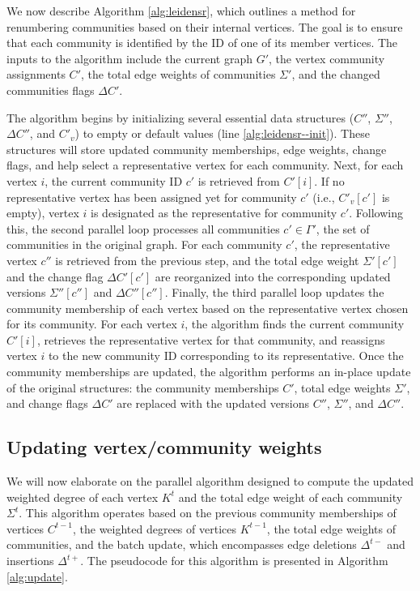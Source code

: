 We now describe Algorithm \ref{alg:leidensr}, which outlines a method for renumbering communities based on their internal vertices. The goal is to ensure that each community is identified by the ID of one of its member vertices. The inputs to the algorithm include the current graph $G'$, the vertex community assignments $C'$, the total edge weights of communities $\Sigma'$, and the changed communities flags $\Delta C'$.

The algorithm begins by initializing several essential data structures ($C''$, $\Sigma''$, $\Delta C''$, and $C'_v$) to empty or default values (line \ref{alg:leidensr--init}). These structures will store updated community memberships, edge weights, change flags, and help select a representative vertex for each community. Next, for each vertex $i$, the current community ID $c'$ is retrieved from $C'[i]$. If no representative vertex has been assigned yet for community $c'$ (i.e., $C'_v[c']$ is empty), vertex $i$ is designated as the representative for community $c'$. Following this, the second parallel loop processes all communities $c' \in \Gamma'$, the set of communities in the original graph. For each community $c'$, the representative vertex $c''$ is retrieved from the previous step, and the total edge weight $\Sigma'[c']$ and the change flag $\Delta C'[c']$ are reorganized into the corresponding updated versions $\Sigma''[c'']$ and $\Delta C''[c'']$. Finally, the third parallel loop updates the community membership of each vertex based on the representative vertex chosen for its community. For each vertex $i$, the algorithm finds the current community $C'[i]$, retrieves the representative vertex for that community, and reassigns vertex $i$ to the new community ID corresponding to its representative. Once the community memberships are updated, the algorithm performs an in-place update of the original structures: the community memberships $C'$, total edge weights $\Sigma'$, and change flags $\Delta C'$ are replaced with the updated versions $C''$, $\Sigma''$, and $\Delta C''$.




\subsection{Updating vertex/community weights}
\label{sec:our-update}

We will now elaborate on the parallel algorithm designed to compute the updated weighted degree of each vertex $K^t$ and the total edge weight of each community $\Sigma^t$. This algorithm operates based on the previous community memberships of vertices $C^{t-1}$, the weighted degrees of vertices $K^{t-1}$, the total edge weights of communities, and the batch update, which encompasses edge deletions $\Delta^{t-}$ and insertions $\Delta^{t+}$. The pseudocode for this algorithm is presented in Algorithm \ref{alg:update}.

